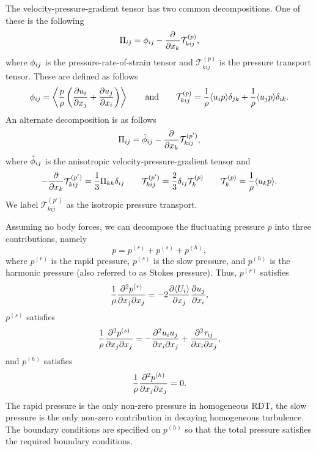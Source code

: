 \documentclass[oneside,a4paper,11pt]{report}
\begin{document}
The velocity-pressure-gradient tensor has two common decompositions. One of these is the following
\begin{equation}
\Pi_{ij} = \phi_{ij} - \frac{\partial}{\partial x_k} \mathcal{T}^{(p)}_{kij},
\end{equation}
where $\phi_{ij}$ is the pressure-rate-of-strain tensor and $\mathcal{T}^{(p)}_{kij}$ is the pressure transport tensor. These are defined as follows
\begin{equation}
\phi_{ij} = \left \langle \frac{p}{\rho} \left ( \frac{\partial u_i}{\partial x_j} + \frac{\partial u_j}{\partial x_i} \right ) \right \rangle \qquad \text{and} \qquad \mathcal{T}^{(p)}_{kij} = \frac{1}{\rho} \langle u_i p \rangle \delta_{jk} + \frac{1}{\rho} \langle u_j p \rangle \delta_{ik}.
\end{equation}
An alternate decomposition is as follows
\begin{equation}
\Pi_{ij} = \hat{\phi}_{ij} - \frac{\partial}{\partial x_k} \mathcal{T}^{(p')}_{kij},
\end{equation}
where $\hat{\phi}_{ij}$ is the anisotropic velocity-pressure-gradient tensor and
\begin{equation}
- \frac{\partial}{\partial x_k} \mathcal{T}^{(p')}_{kij} = \frac{1}{3} \Pi_{kk} \delta_{ij} \qquad
\mathcal{T}^{(p')}_{kij} =  \frac{2}{3} \delta_{ij} \mathcal{T}^{(p)}_k \qquad
\mathcal{T}^{(p)}_{k} = \frac{1}{\rho} \langle u_k p \rangle.
\end{equation}
We label $\mathcal{T}^{(p')}_{kij}$ as the isotropic pressure transport.

Assuming no body forces, we can decompose the fluctuating pressure $p$ into three contributions, namely
\begin{equation}
p = p^{(r)} + p^{(s)} + p^{(h)},
\end{equation}
where $p^{(r)}$ is the rapid pressure, $p^{(s)}$ is the slow pressure, and $p^{(h)}$ is the harmonic pressure (also referred to as Stokes pressure). Thus, $p^{(r)}$ satisfies
\begin{equation}
\frac{1}{\rho} \frac{\partial^2 p^{(r)}}{\partial x_j \partial x_j} = -2 \frac{\partial \langle U_i \rangle}{\partial x_j} \frac{\partial u_j}{\partial x_i},
\end{equation}
$p^{(s)}$ satisfies
\begin{equation}
\frac{1}{\rho} \frac{\partial^2 p^{(s)}}{\partial x_j \partial x_j} = - \frac{\partial^2 u_i u_j}{\partial x_i \partial x_j} + \frac{\partial^2 \tau_{ij}}{\partial x_i \partial x_j},
\end{equation}
and $p^{(h)}$ satisfies
\begin{equation}
\frac{1}{\rho} \frac{\partial^2 p^{(h)}}{\partial x_j \partial x_j} = 0.
\end{equation}
The rapid pressure is the only non-zero pressure in homogeneous RDT, the slow pressure is the only non-zero contribution in decaying homogeneous turbulence. The boundary conditions are specified on $p^{(h)}$ so that the total pressure satisfies the required boundary conditions.
\end{document}
